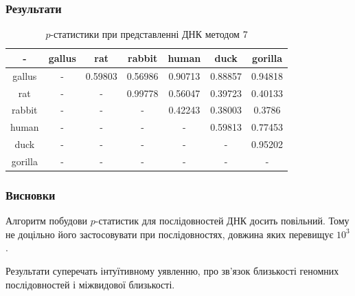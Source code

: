 \documentclass[mathserif,serif,10pt]{beamer}
\begin{document}
\begin{frame}
\frametitle{Результати}

\begin{table}[h!]
\begin{center}
\begin{tabular}{|c|c|c|c|c|c|c|}
\hline
- & gallus & rat & rabbit & human & duck & gorilla \\ \hline
gallus & - & 0.59803 & 0.56986 & 0.90713 & 0.88857 & 0.94818 \\ \hline
rat & - & - & 0.99778 & 0.56047 & 0.39723 & 0.40133 \\ \hline
rabbit & - & - & - & 0.42243 & 0.38003 & 0.3786 \\ \hline
human & - & - & - & - & 0.59813 & 0.77453 \\ \hline
duck & - & - & - & - & - & 0.95202 \\ \hline
gorilla & - & - & - & - & - & - \\ \hline
\end{tabular}
\end{center}
\caption{$p$-статистики при представленні ДНК методом 7}
\label{table:res7}
\end{table}
\end{frame}

\begin{frame}
\frametitle{Висновки}
Алгоритм побудови $p$-статистик для послідовностей ДНК досить повільний. Тому не доцільно його застосовувати при послідовностях, довжина яких перевищує $10^3$.
\par

Результати суперечать інтуїтивному уявленню, про зв’язок близькості геномних послідовностей і міжвидової близькості.
\end{frame}
\end{document}
